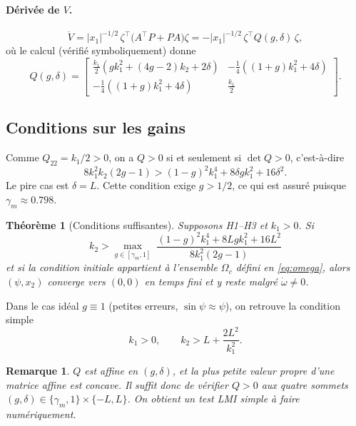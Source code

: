 \documentclass[11pt,a4paper]{article}
\newtheorem*{theorem*}{Théorème}
\newtheorem{remarque}{Remarque}
\begin{document}
\paragraph{Dérivée de $V$.}
\begin{equation}
\dot V = |x_1|^{-1/2}\,\zeta^\top\big(A^\top P + PA\big)\zeta = -|x_1|^{-1/2}\,\zeta^\top Q(g,\delta)\,\zeta,
\end{equation}
où le calcul (vérifié symboliquement) donne
\begin{equation}
Q(g,\delta) = \begin{bmatrix}
\tfrac{k_1}{2}\left(gk_1^2 + (4g-2)k_2 + 2\delta\right) & -\tfrac14\left((1+g)k_1^2+4\delta\right)\\[2pt]
-\tfrac14\left((1+g)k_1^2+4\delta\right) & \tfrac{k_1}{2}
\end{bmatrix}.
\end{equation}

\subsection{Conditions sur les gains}
Comme $Q_{22}=k_1/2>0$, on a $Q>0$ si et seulement si $\det Q>0$, c'est-à-dire
\begin{equation}
8k_1^2k_2(2g-1) > (1-g)^2k_1^4 + 8\delta g k_1^2 + 16\delta^2 .
\end{equation}
Le pire cas est $\delta=L$. Cette condition exige $g>1/2$, ce qui est assuré puisque $\gamma_m\approx0.798$.

\begin{theorem*}[Conditions suffisantes]
Supposons H1--H3 et $k_1>0$. Si
\begin{equation}\label{eq:k2}
\boxed{\;k_2 > \max_{g\in[\gamma_m,1]}\;
\frac{(1-g)^2k_1^4 + 8Lgk_1^2 + 16L^2}{8k_1^2(2g-1)}\;}
\end{equation}
et si la condition initiale appartient à l'ensemble $\Omega_c$ défini en \eqref{eq:omega}, alors
$(\psi,x_2)$ converge vers $(0,0)$ en temps fini et y reste malgré $\dot\omega\neq0$.
\end{theorem*}

Dans le cas idéal $g\equiv 1$ (petites erreurs, $\sin\psi\approx\psi$), on retrouve la condition simple
\begin{equation}
k_1>0,\qquad k_2 > L + \frac{2L^2}{k_1^2}.
\end{equation}

\begin{remarque}
$Q$ est affine en $(g,\delta)$, et la plus petite valeur propre d'une matrice affine est concave.
Il suffit donc de vérifier $Q>0$ aux quatre sommets $(g,\delta)\in\{\gamma_m,1\}\times\{-L,L\}$.
On obtient un test LMI simple à faire numériquement.
\end{remarque}
\end{document}
